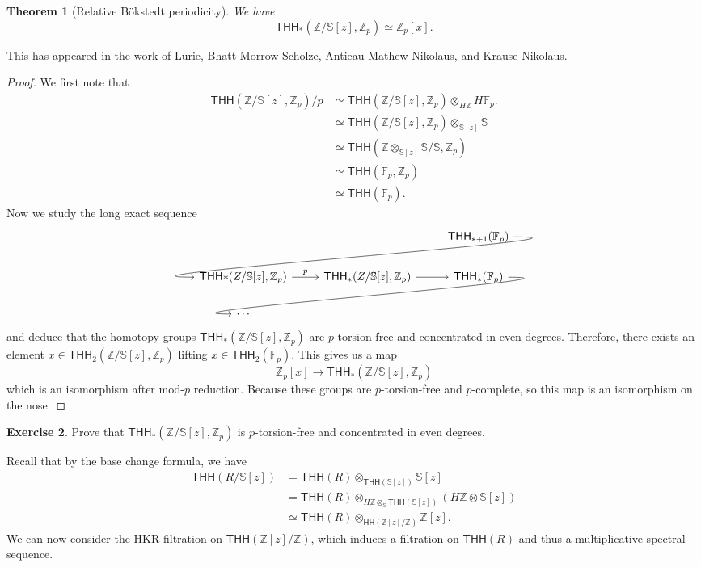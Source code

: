 \documentclass[10pt, oneside]{memoir}
\newtheorem{thm}{Theorem}[subsection]
\theoremstyle{definition}
\newtheorem{exer}[thm]{Exercise}
\theoremstyle{remark}
\theoremstyle{plain}
\theoremstyle{definition}
\theoremstyle{remark}
\newcommand{\Z}{\mathbb{Z}}
\newcommand{\F}{\mathbb{F}}
\newcommand{\bS}{\mathbb{S}}
\newcommand{\ms}[1]{\mathsf{#1}}
\newcommand{\1}{\mathbf{1}}
\newcommand{\2}{\mathbf{2}}
\newcommand{\3}{\mathbf{3}}
\newcommand{\THH}{\ms{THH}}
\newcommand{\HH}{\ms{HH}}
\begin{document}
\begin{thm}[Relative B\"okstedt periodicity]
    We have
    \[ \THH_*(\Z/\bS[z], \Z_p) \simeq \Z_p [ x]. \]
\end{thm}

This has appeared in the work of Lurie, Bhatt-Morrow-Scholze, Antieau-Mathew-Nikolaus, and Krause-Nikolaus.

\begin{proof}
    We first note that
    \begin{align*}
        \THH(\Z/\bS[z], \Z_p) / p &\simeq \THH(\Z/\bS[z], \Z_p) \otimes_{H \Z} H \F_p. \\
        &\simeq \THH(\Z/\bS[z], \Z_p) \otimes_{\bS[z]} \bS \\
        &\simeq \THH(\Z \otimes_{\bS[z]} \bS / \bS, \Z_p) \\
        &\simeq \THH(\F_p, \Z_p) \\
        &\simeq \THH(\F_p).
    \end{align*}
    Now we study the long exact sequence
    \begin{equation*}
        \begin{tikzcd}
            & & \THH_{*+1}(\F_p) \arrow[out=0, in=180, looseness=1]{dll} \\
            \THH{*}(Z/\bS[z], \Z_p) \ar{r}{p} & \THH_*(Z/\bS[z], \Z_p) \ar{r} & \THH_*(\F_p) \arrow[out=0,in=180, looseness=1]{dll} \\
            \cdots
        \end{tikzcd}
    \end{equation*}
    and deduce that the homotopy groups $\THH_*(\Z/\bS[z], \Z_p)$ are $p$-torsion-free and concentrated in even degrees. Therefore, there exists an element $x \in \THH_2(\Z/\bS[z], \Z_p)$ lifting $x \in \THH_2(\F_p)$. This gives us a map
    \[ \Z_p [ x] \to \THH_* (\Z/\bS[z], \Z_p) \]
    which is an isomorphism after mod-$p$ reduction. Because these groups are $p$-torsion-free and $p$-complete, so this map is an isomorphism on the nose.
\end{proof}

\begin{exer}
    Prove that $\THH_*(\Z/\bS[z], \Z_p)$ is $p$-torsion-free and concentrated in even degrees.
\end{exer}

Recall that by the base change formula, we have
\begin{align*}
    \THH(R/\bS[z]) &= \THH(R) \otimes_{\THH(\bS[z])} \bS [z] \\
    &= \THH(R) \otimes_{H\Z \otimes_{\bS} \THH(\bS[z])} (H \Z \otimes \bS[z]) \\
    &\simeq \THH(R) \otimes_{\HH(\Z[z]/\Z)} \Z[z].
\end{align*}
We can now consider the HKR filtration on $\THH(\Z[z]/\Z)$, which induces a filtration on $\THH(R)$ and thus a multiplicative spectral sequence.
\end{document}
